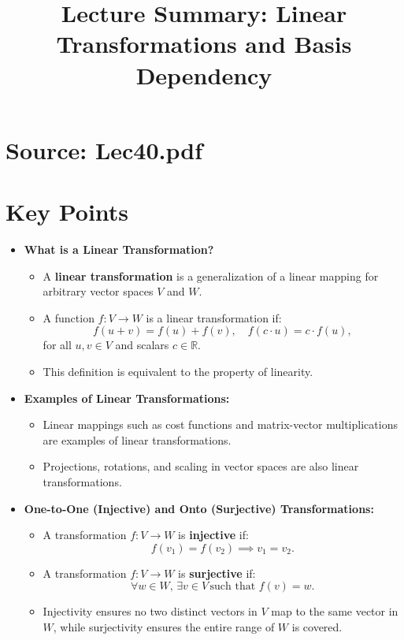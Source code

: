 \documentclass{article}
\title{Lecture Summary: Linear Transformations and Basis Dependency}
\author{}
\date{}
\begin{document}
\maketitle

\section*{Source: Lec40.pdf}

\section*{Key Points}

\begin{itemize}
  \item \textbf{What is a Linear Transformation?}
    \begin{itemize}
      \item A \textbf{linear transformation} is a generalization of a linear mapping for arbitrary vector spaces $V$ and $W$.
      \item A function $f: V \to W$ is a linear transformation if:
        \[
          f(u + v) = f(u) + f(v), \quad f(c \cdot u) = c \cdot f(u),
        \]
        for all $u, v \in V$ and scalars $c \in \mathbb{R}$.
      \item This definition is equivalent to the property of linearity.
    \end{itemize}

  \item \textbf{Examples of Linear Transformations:}
    \begin{itemize}
      \item Linear mappings such as cost functions and matrix-vector multiplications are examples of linear transformations.
      \item Projections, rotations, and scaling in vector spaces are also linear transformations.
    \end{itemize}

  \item \textbf{One-to-One (Injective) and Onto (Surjective) Transformations:}
    \begin{itemize}
      \item A transformation $f: V \to W$ is \textbf{injective} if:
        \[
          f(v_1) = f(v_2) \implies v_1 = v_2.
        \]
      \item A transformation $f: V \to W$ is \textbf{surjective} if:
        \[
          \forall w \in W, \, \exists v \in V \, \text{such that } f(v) = w.
        \]
      \item Injectivity ensures no two distinct vectors in $V$ map to the same vector in $W$, while surjectivity ensures the entire range of $W$ is covered.
    \end{itemize}


\end{itemize}
\end{document}
